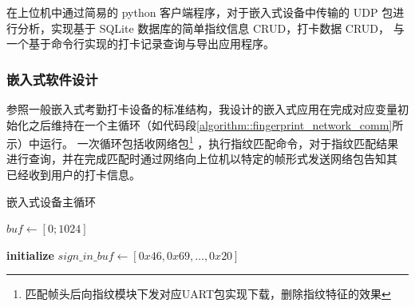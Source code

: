     在上位机中通过简易的 python 客户端程序，对于嵌入式设备中传输的 UDP 包进行分析，实现基于 SQLite 数据库的简单指纹信息 CRUD，打卡数据 CRUD，
    与一个基于命令行实现的打卡记录查询与导出应用程序。

    \subsubsection{嵌入式软件设计}

    参照一般嵌入式考勤打卡设备的标准结构，我设计的嵌入式应用在完成对应变量初始化之后维持在一个主循环（如代码段\ref{algorithm::fingerprint_network_comm}所示）中运行。
    一次循环包括收网络包\footnote{匹配帧头后向指纹模块下发对应UART包实现下载，删除指纹特征的效果}
    ，执行指纹匹配命令，对于指纹匹配结果进行查询，并在完成匹配时通过网络向上位机以特定的帧形式发送网络包告知其
    已经收到用户的打卡信息。

    \begin{algorithm}[htb]
        \caption{嵌入式设备主循环}
        \label{algorithm::fingerprint_network_comm}
        \begin{algorithmic}[1]
         
             
                    \State {} 
                \EndIf
                \State $buf \gets [0; 1024]$ 
            \EndIf
        
            \State {} 

            \State {} 
            \State {} 
            
            \State {} 
        
              
                \State {} 
                
                    \State \textbf{initialize} $sign\_in\_buf \gets [0x46, 0x69, \ldots, 0x20]$ 
                    \State {} 
                    \State {}
                    \State {} 
                \EndIf
                \State {}
            \EndIf
        \EndWhile
        \end{algorithmic}
        \end{algorithm}
        

